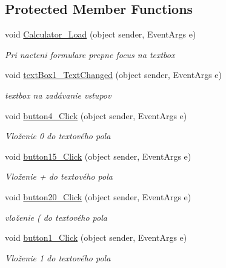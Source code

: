\subsection*{Protected Member Functions}
\begin{DoxyCompactItemize}
\item 
void \mbox{\hyperlink{class_i_v_s_1_1_calculator_a3c3a8cab086cf9f773e7b4dbddcbad58}{Calculator\+\_\+\+Load}} (object sender, Event\+Args e)
\begin{DoxyCompactList}\small\item\em Pri nacteni formulare prepne focus na textbox \end{DoxyCompactList}\item 
void \mbox{\hyperlink{class_i_v_s_1_1_calculator_a5b2424094c9a7228f4b71fd9e27a79ca}{text\+Box1\+\_\+\+Text\+Changed}} (object sender, Event\+Args e)
\begin{DoxyCompactList}\small\item\em textbox na zadávanie vstupov \end{DoxyCompactList}\item 
void \mbox{\hyperlink{class_i_v_s_1_1_calculator_ac1763f222a684150c84c3fe98c0820e1}{button4\+\_\+\+Click}} (object sender, Event\+Args e)
\begin{DoxyCompactList}\small\item\em Vloženie \textquotesingle{}0\textquotesingle{} do textového pola \end{DoxyCompactList}\item 
void \mbox{\hyperlink{class_i_v_s_1_1_calculator_a4aab8fcd134875c22735f5c69709f3a9}{button15\+\_\+\+Click}} (object sender, Event\+Args e)
\begin{DoxyCompactList}\small\item\em Vloženie \textquotesingle{}+\textquotesingle{} do textového pola \end{DoxyCompactList}\item 
void \mbox{\hyperlink{class_i_v_s_1_1_calculator_abb0b26c38b19fed222be5905a63db4fa}{button20\+\_\+\+Click}} (object sender, Event\+Args e)
\begin{DoxyCompactList}\small\item\em vloženie \textquotesingle{}(\textquotesingle{} do textového pola \end{DoxyCompactList}\item 
void \mbox{\hyperlink{class_i_v_s_1_1_calculator_acb35f01364be2f89cd6615bfe6b90725}{button1\+\_\+\+Click}} (object sender, Event\+Args e)
\begin{DoxyCompactList}\small\item\em Vloženie \textquotesingle{}1\textquotesingle{} do textového pola \end{DoxyCompactList}\item 

\end{DoxyCompactItemize}
